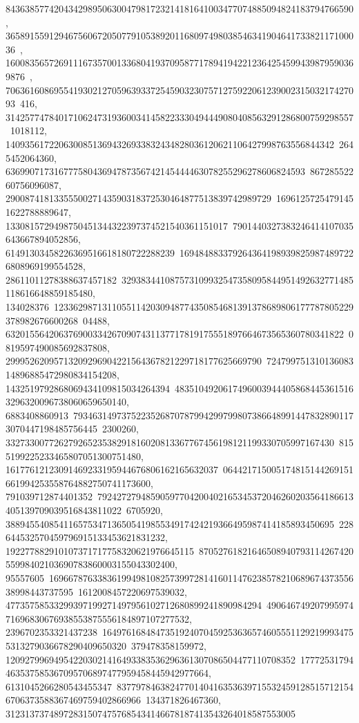 {{{   843638577420434298950630047981723214181641003477074885094824183794766590, 
   36589155912946756067205077910538920116809749803854634190464173382117100036\
, 
   1600835657269111673570013368041937095877178941942212364254599439879590369876\
, 
   70636160869554193021270596393372545903230757127592206123900231503217427093\
416, 314257747840171062473193600341458223330494449080408563291286800759298557\
1018112, 14093561722063008513694326933832434828036120621106427998763556844342\
2645452064360, 63699071731677758043694787356742145444463078255296278606824593\
86728552260756096087, 2900874181335550027143590318372530464877513839742989729\
16961257254791451622788889647, 1330815729498750451344322397374521540361151017\
7901440327383246414107035643667894052856, 61491303458226369516618180722288239\
1694848833792643641989398259874897226808969199554528, 28611011278388637457182\
329383441087573109932547358095844951492632771485118616648859185480, 134028376\
12336298713110551142030948774350854681391378689806177787805229378982676600268\
04488, 6320155642063769003342670907431137717819175551897664673565360780341822\
0819597490085692837808, 29995262095713209296904221564367821229718177625669790\
72479975131013608314896885472980834154208, 1432519792868069434109815034264394\
48351049206174960039444058684453615163296320096738060659650140, 6883408860913\
79346314973752235268707879942997998073866489914478328901173070447198485756445\
2300260, 33273300772627926523538291816020813367767456198121199330705997167430\
8155199225233465807051300751480, 16177612123091469233195944676806162165632037\
064421715005174815144269151661994253558764882750741173600, 791039712874401352\
79242727948590597704200402165345372046260203564186613405139709039516843811022\
6705920, 38894554085411657534713650541985534917424219366495987414185893450695\
228644532570459796915133453621831232, 192277882910107371717758320621976645115\
8705276182164650894079311426742055998402103690783860003155043302400, 95557605\
16966787633836199498108257399728141601147623857821068967437355638998443737595\
1612008457220697539032, 47735758533299397199271497956102712680899241890984294\
49064674920799597471696830676938553875556184897107277532, 2396702353321437238\
16497616848473519240704592536365746055511292199934755313279036678290409650320\
379478358159972, 120927996949542203021416493383536296361307086504477110708352\
17772531794463537585367095706897477959458445942977664, 6131045266280543455347\
83779784638247701404163536397155324591285157121546706373588367469759402866966\
134371826467360, 312313737489728315074757685434146678187413543264018587553005\
}}}
